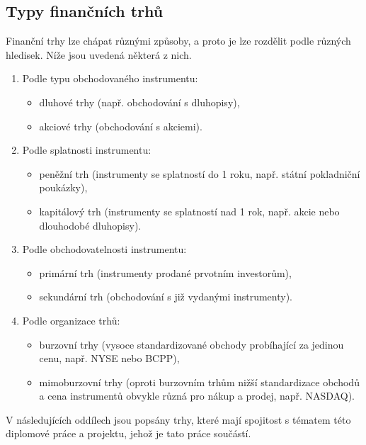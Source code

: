 \documentclass[thesis=M,czech]{FITthesis}[2012/06/26]
\begin{document}

\subsection{Typy finančních trhů}

Finanční trhy lze chápat různými způsoby, a proto je lze rozdělit podle různých hledisek. Níže jsou uvedená některá z nich.  

\begin{enumerate}
	\item Podle typu obchodovaného instrumentu:
		\begin{itemize}
			\item dluhové trhy (např. obchodování s dluhopisy),
			\item akciové trhy (obchodování s akciemi).
		\end{itemize}
	\item Podle splatnosti instrumentu:
		\begin{itemize}
			\item peněžní trh (instrumenty se splatností do 1 roku, např. státní pokladniční poukázky),
			\item kapitálový trh (instrumenty se splatností nad 1 rok, např. akcie nebo dlouhodobé dluhopisy).
		\end{itemize}
	\item Podle obchodovatelnosti instrumentu:
		\begin{itemize}
			\item primární trh (instrumenty prodané prvotním investorům),
			\item sekundární trh (obchodování s již vydanými instrumenty).
		\end{itemize}
	\item Podle organizace trhů:
		\begin{itemize}
			\item burzovní trhy (vysoce standardizované obchody probíhající za jedinou cenu, např. NYSE nebo BCPP),
			\item mimoburzovní trhy (oproti burzovním trhům nižší standardizace obchodů a cena instrumentů 
				obvykle různá pro nákup a prodej, např. NASDAQ).
		\end{itemize}
\end{enumerate}

V následujících oddílech jsou popsány trhy, které mají spojitost s tématem této diplomové práce a projektu, 
jehož je tato práce součástí.

\end{document}
